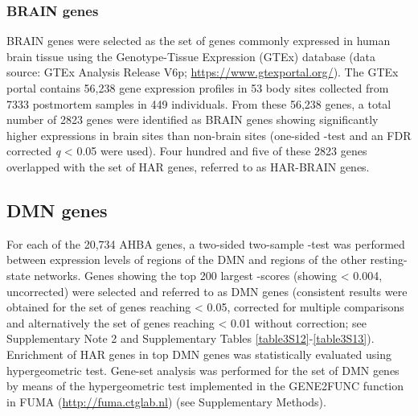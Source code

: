\begin{refsection}
\subsubsection*{BRAIN genes}
BRAIN genes were selected as the set of genes commonly expressed in human brain tissue using the Genotype-Tissue Expression (GTEx) database (data source: GTEx Analysis Release V6p; \url{https://www.gtexportal.org/}). The GTEx portal contains 56,238 gene expression profiles in 53 body sites collected from 7333 postmortem samples in 449 individuals. From these 56,238 genes, a total number of 2823 genes were identified as BRAIN genes showing significantly higher expressions in brain sites than non-brain sites (one-sided \tvaldf-test and an FDR corrected \textit{q} < 0.05 were used). Four hundred and five of these 2823 genes overlapped with the set of HAR genes, referred to as HAR-BRAIN genes.

\subsection*{DMN genes}
For each of the 20,734 AHBA genes, a two-sided two-sample \tvaldf-test was performed between expression levels of regions of the DMN and regions of the other resting-state networks. Genes showing the top 200 largest \tvaldf-scores (showing \pval < 0.004, uncorrected) were selected and referred to as DMN genes (consistent results were obtained for the set of genes reaching \pval < 0.05, corrected for multiple comparisons and alternatively the set of genes reaching \pval < 0.01 without correction; see Supplementary Note 2 and Supplementary Tables \ref{table3S12}-\ref{table3S13}). Enrichment of HAR genes in top DMN genes was statistically evaluated using hypergeometric test. Gene-set analysis was performed for the set of DMN genes by means of the hypergeometric test implemented in the GENE2FUNC function in FUMA (\url{http://fuma.ctglab.nl}) \citep{watanabe2017functional} (see Supplementary Methods).


\end{refsection}
